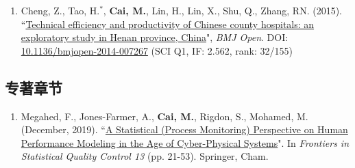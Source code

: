 \documentclass[11pt, a4paper]{article}
\newcommand{\years}[1]{\marginnote{\scriptsize #1}}
\begin{document}
\begin{enumerate}[leftmargin=0ex,itemsep=1ex]
		\item \years{2015}Cheng, Z., Tao, H.$^\ast$, \textbf{Cai, M.}, Lin, H., Lin, X., Shu, Q., Zhang, RN. (2015). ``\ul{Technical efficiency and productivity of Chinese county hospitals: an exploratory study in Henan province, China}", \emph{BMJ Open}. DOI: \href{https://doi.org/10.1136/bmjopen-2014-007267}{10.1136/bmjopen-2014-007267} (SCI Q1, IF: 2.562, rank: 32/155)
	\end{enumerate}
	
	\subsection*{专著章节}
	\begin{enumerate}[leftmargin=0ex,itemsep=1ex]
		\item Megahed, F., Jones-Farmer, A., \textbf{Cai, M.}, Rigdon, S., Mohamed, M. (December, 2019). ``\ul{A Statistical (Process Monitoring) Perspective on Human Performance Modeling in the Age of Cyber-Physical Systems}". In \textit{Frontiers in Statistical Quality Control 13} (pp. 21-53). Springer, Cham.
	\end{enumerate}
	
	
\end{document}
